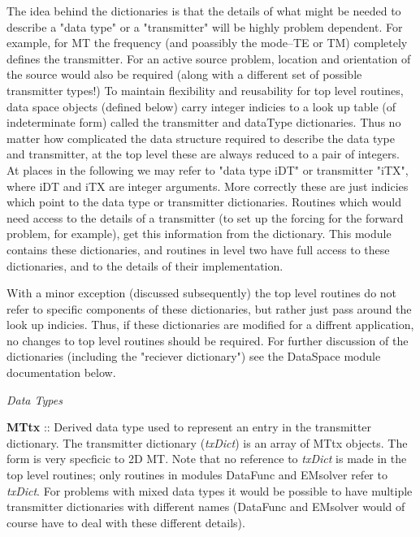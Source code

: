 \documentclass[12pt]{article}
\begin{document}
The idea behind the dictionaries is that
the details of what might be needed to describe a
"data type" or a "transmitter" will be highly 
problem dependent.  For example, for MT the frequency
(and poassibly the mode--TE or TM) completely defines the transmitter.
For an active source problem, location and orientation
of the source would also be required (along with a different
set of possible transmitter types!)  To maintain
flexibility and reusability for top level routines,
data space objects (defined below) carry integer
indicies to a look up table (of indeterminate form) called
the transmitter and dataType dictionaries.  Thus no
matter how complicated the data structure required
to describe the data type and transmitter, at the top
level these are always reduced to a pair of integers.
At places in the following we may refer to "data type iDT"
or transmitter "iTX", where iDT and iTX are integer arguments.
More correctly these are just indicies which point
to the data type or transmitter dictionaries.
Routines which would need access to the details of a
transmitter (to set up the forcing for the forward
problem, for example), get this information from the
dictionary.  This module contains these dictionaries,
and routines in level two have full access to these
dictionaries, and to the details of their implementation.

With a minor exception (discussed subsequently) the
top level routines do not refer to specific components
of these dictionaries, but rather just pass around the
look up indicies.  Thus, if these dictionaries are modified
for a diffrent application, no changes to top level routines
should be required.  For further discussion of the dictionaries
(including the "reciever dictionary") see the DataSpace
module documentation below.

\vspace{10pt}

\noindent
{\it Data Types}

\vspace{6pt}

{\bf MTtx} :: Derived data type used to represent an entry in the transmitter
dictionary.  The transmitter dictionary ({\it txDict}) is an array of MTtx
objects.  The form is very specficic to 2D MT.  Note that
no reference to {\it txDict} is made in the top level routines;
only routines in modules DataFunc and EMsolver refer 
to {\it txDict}.  For
problems with mixed data types it would be possible to have
multiple transmitter dictionaries with different names
(DataFunc and EMsolver would of course have to deal with these
different details). 
\end{document}
